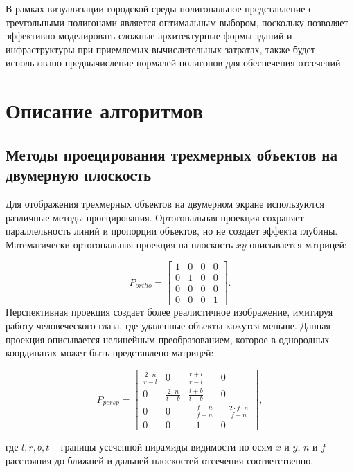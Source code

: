 В рамках визуализации городской среды полигональное представление с треугольными полигонами является оптимальным выбором, поскольку позволяет эффективно моделировать сложные архитектурные формы зданий и инфраструктуры при приемлемых вычислительных затратах, также будет использовано предвычисление нормалей полигонов для обеспечения отсечений.

\section{Описание алгоритмов}


\subsection{Методы проецирования трехмерных объектов на двумерную плоскость}
Для отображения трехмерных объектов на двумерном экране используются различные методы проецирования. Ортогональная проекция сохраняет параллельность линий и пропорции объектов, но не создает эффекта глубины. Математически ортогональная проекция на плоскость $xy$ описывается матрицей:

\begin{equation}
P_{ortho} = \begin{bmatrix}
1 & 0 & 0 & 0 \\
0 & 1 & 0 & 0 \\
0 & 0 & 0 & 0 \\
0 & 0 & 0 & 1
\end{bmatrix}.
\end{equation}
Перспективная проекция создает более реалистичное изображение, имитируя работу человеческого глаза, где удаленные объекты кажутся меньше. Данная проекция описывается нелинейным преобразованием, которое в однородных координатах может быть представлено матрицей:

\begin{equation}
P_{persp} = \begin{bmatrix}
\frac{2 \cdot n}{r - l} & 0 & \frac{r + l}{r - l} & 0 \\
0 & \frac{2 \cdot n}{t - b} & \frac{t + b}{t - b} & 0 \\
0 & 0 & -\frac{f + n}{f - n} & -\frac{2 \cdot f \cdot n}{f - n} \\
0 & 0 & -1 & 0
\end{bmatrix},
\end{equation}

где $l, r, b, t$ -- границы усеченной пирамиды видимости по осям $x$ и $y$, $n$ и $f$ -- расстояния до ближней и дальней плоскостей отсечения соответственно.
